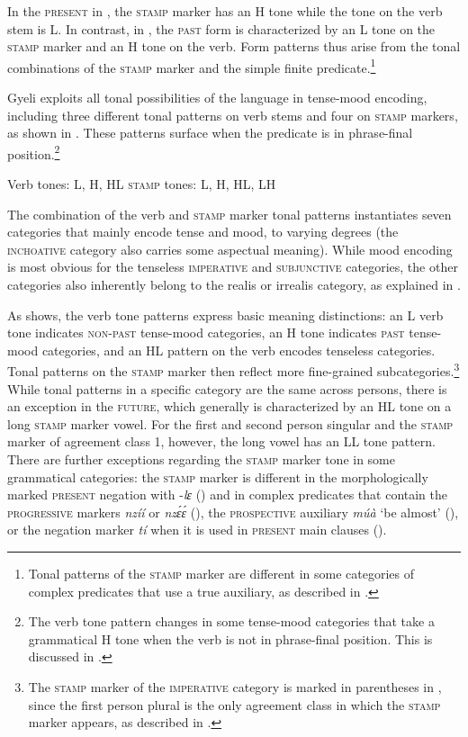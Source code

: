 \noindent In the \textsc{present} in , the \textsc{stamp} marker has an H tone while the tone on the verb stem is L. In contrast, in , the \textsc{past} form is characterized by an L tone on the \textsc{stamp} marker and an H tone on the verb.
Form patterns thus arise from the tonal combinations of the \textsc{stamp} marker and the simple finite predicate.\footnote{Tonal patterns of the \textsc{stamp} marker are different in some categories of complex predicates that use a true auxiliary, as described in .} 

Gyeli exploits all tonal possibilities of the language in tense-mood encoding, including three different tonal patterns on verb stems and four on \textsc{stamp} markers, as shown in . These patterns surface when the predicate is in phrase-final position.\footnote{The verb tone pattern changes in some tense-mood categories that take a grammatical H tone when the verb is not in phrase-final position. This is discussed in .}

\ea \label{PredTone}
\ea  Verb tones: L, H, HL
\ex \textsc{stamp} tones: L, H, HL, LH
\z
\z

\noindent The combination of the verb and \textsc{stamp} marker tonal patterns instantiates seven categories that mainly encode tense and mood, to varying degrees (the \textsc{inchoative} category  also carries some aspectual meaning). While mood encoding is most obvious for the tenseless \textsc{imperative} and \textsc{subjunctive} categories,  the other categories also inherently belong to the realis or irrealis category, as explained in .  

As  shows, the verb tone patterns express  basic meaning distinctions: an L verb tone indicates \textsc{non-past} tense-mood categories, an H tone indicates \textsc{past} tense-mood categories, and an HL pattern on the verb encodes tenseless categories. Tonal patterns on the \textsc{stamp} marker then reflect more fine-grained subcategories.\footnote{The \textsc{stamp} marker of the \textsc{imperative} category is marked in parentheses in , since the first person plural is the only agreement class in which the \textsc{stamp} marker appears, as described in .} While tonal patterns in a specific category are the same across persons, there is an exception in the \textsc{future}, which generally is characterized by an HL tone on a long \textsc{stamp} marker vowel. For the first and second person singular and the \textsc{stamp} marker of agreement class 1, however, the long vowel has an LL tone pattern. There are further exceptions regarding the \textsc{stamp} marker tone in some grammatical categories: the \textsc{stamp} marker is different in the morphologically marked \textsc{present} negation with -{\itshape lɛ} () and in complex predicates that contain the \textsc{progressive} markers {\itshape nzíí} or {\itshape nzɛ́ɛ́} (), the \textsc{prospective} auxiliary {\itshape múà} `be almost' (), or the negation marker {\itshape tí} when it is used in \textsc{present} main clauses ().


